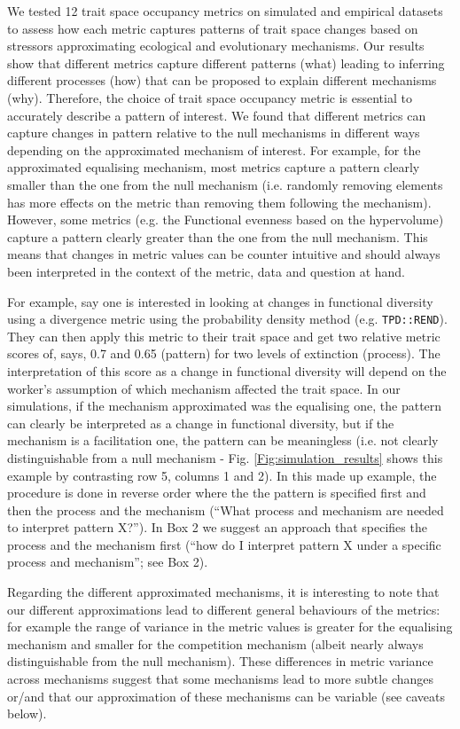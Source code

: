 \documentclass[12pt,letterpaper]{article}
\begin{document}
We tested 12 trait space occupancy metrics on simulated and empirical datasets to assess how each metric captures patterns of trait space changes based on stressors approximating ecological and evolutionary mechanisms.
Our results show that different metrics capture different patterns (what) leading to inferring different processes (how) that can be proposed to explain different mechanisms (why).
Therefore, the choice of trait space occupancy metric is essential to accurately describe a pattern of interest.
We found that different metrics can capture changes in pattern relative to the null mechanisms in different ways depending on the approximated mechanism of interest.
For example, for the approximated equalising mechanism, most metrics capture a pattern clearly smaller than the one from the null mechanism (i.e. randomly removing elements has more effects on the metric than removing them following the mechanism).
However, some metrics (e.g. the Functional evenness based on the hypervolume) capture a pattern clearly greater than the one from the null mechanism.
This means that changes in metric values can be counter intuitive and should always been interpreted in the context of the metric, data and question at hand.

For example, say one is interested in looking at changes in functional diversity using a divergence metric using the probability density method (e.g. \texttt{TPD::REND}).
They can then apply this metric to their trait space and get two relative metric scores of, says, 0.7 and 0.65 (pattern) for two levels of extinction (process).
The interpretation of this score as a change in functional diversity will depend on the worker's assumption of which mechanism affected the trait space.
In our simulations, if the mechanism approximated was the equalising one, the pattern can clearly be interpreted as a change in functional diversity, but if the mechanism is a facilitation one, the pattern can be meaningless (i.e. not clearly distinguishable from a null mechanism - Fig. \ref{Fig:simulation_results} shows this example by contrasting row 5, columns 1 and 2).
In this made up example, the procedure is done in reverse order where the the pattern is specified first and then the process and the mechanism (``What process and mechanism are needed to interpret pattern X?'').
In Box 2 we suggest an approach that specifies the process and the mechanism first (``how do I interpret pattern X under a specific process and mechanism''; see Box 2).

Regarding the different approximated mechanisms, it is interesting to note that our different approximations lead to different general behaviours of the metrics: for example the range of variance in the metric values is greater for the equalising mechanism and smaller for the competition mechanism (albeit nearly always distinguishable from the null mechanism).
These differences in metric variance across mechanisms suggest that some mechanisms lead to more subtle changes or/and that our approximation of these mechanisms can be variable (see caveats below).
\end{document}
